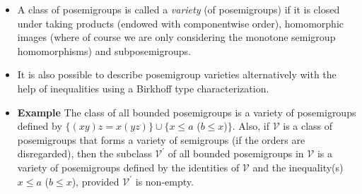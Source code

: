 \documentclass[notes=show]{beamer}
\newenvironment{stepitemize}{\begin{itemize}[<+->]}{\end{itemize} }
\begin{document}
\begin{frame}%


\begin{stepitemize}
\item A class of posemigroups is called a \textit{variety }(of posemigroups)
if it is closed under taking products (endowed with componentwise order),
homomorphic images (where of course we are only considering the monotone
semigroup homomorphisms) and subposemigroups.\bigskip

\item It is also possible to describe posemigroup varieties alternatively
with the help of inequalities using a Birkhoff type
characterization.\bigskip 

\item \textbf{Example} The class of all bounded posemigroups is a variety of
posemigroups defined by $\{(xy)z=x(yz)\}\cup \{x\leq a$ ($b\leq x$)$\}$.
Also, if $\mathcal{V}$ is a class of posemigroups that forms a variety of
semigroups (if the orders are disregarded), then the subclass $\mathcal{V}%
^{\prime }$ of all bounded posemigroups in $\mathcal{V}$ is a variety of
posemigroups defined by the identities of $\mathcal{V}$ and the
inequality(s) $x\leq a$ ($b\leq x$), provided $\mathcal{V}^{\prime }$ is
non-empty.
\end{stepitemize}

\transboxout%
\end{frame}%
\end{document}
